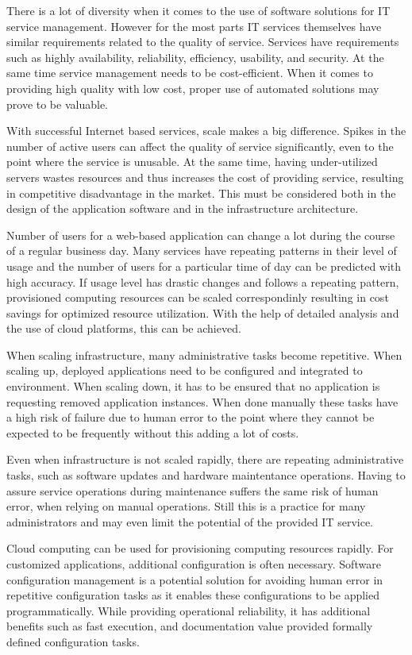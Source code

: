 \documentclass[officiallayout]{tktla}
\begin{document}
There is a lot of diversity when it comes to the use of software solutions for
IT service management. However for the most parts IT services themselves have
similar requirements related to the quality of service. Services have
requirements such as highly availability, reliability, efficiency, usability,
and security. At the same time service management needs to be cost-efficient.
When it comes to providing high quality with low cost, proper use of automated
solutions may prove to be valuable.

With successful Internet based services, scale makes a big difference. Spikes
in the number of active users can affect the quality of service significantly,
even to the point where the service is unusable. At the same time, having
under-utilized servers wastes resources and thus increases the cost of
providing service, resulting in competitive disadvantage in the market. This
must be considered both in the design of the application software and in the
infrastructure architecture.

Number of users for a web-based application can change a lot during the course
of a regular business day. Many services have repeating patterns in their
level of usage and the number of users for a particular time of day can be
predicted with high accuracy. If usage level has drastic changes and follows a
repeating pattern, provisioned computing resources can be scaled correspondinly
resulting in cost savings for optimized resource utilization. With the help of
detailed analysis and the use of cloud platforms, this can be achieved.

When scaling infrastructure, many administrative tasks become repetitive. When
scaling up, deployed applications need to be configured and integrated to
environment. When scaling down, it has to be ensured that no application is
requesting removed application instances. When done manually these tasks have a
high risk of failure due to human error to the point where they cannot be
expected to be frequently without this adding a lot of costs.

Even when infrastructure is not scaled rapidly, there are repeating
administrative tasks, such as software updates and hardware maintentance
operations. Having to assure service operations during maintenance suffers the
same risk of human error, when relying on manual operations. Still this is a
practice for many administrators and may even limit the potential of the
provided IT service.

Cloud computing can be used for provisioning computing resources rapidly. For
customized applications, additional configuration is often necessary. Software
configuration management is a potential solution for avoiding human error in
repetitive configuration tasks as it enables these configurations to be applied
programmatically. While providing operational reliability, it has additional
benefits such as fast execution, and documentation value provided formally
defined configuration tasks.
\end{document}
